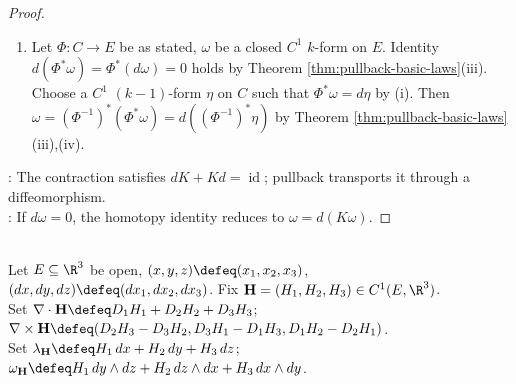 \begin{theorem}
\begin{proof}
\begin{enumerate}[label=(\roman*)]
Coefficients containing $dx_j$ with $j\notin I$ cancel against those of $K(d(b_I\,dx_I))$. Signs are opposite by Proposition \ref{prop:basic-forms-standard-presentation}(i).\\
Hence $dK\omega+Kd\omega=\omega$. If $d\omega=0$, then $K\omega\in C^1$ and $\omega=d(K\omega)$, so $\omega$ is exact.
\item Let $\Phi:C\to E$ be as stated, $\omega$ be a closed $C^1$ $k$-form on $E$. Identity $d(\Phi^\ast\omega)=\Phi^\ast(d\omega)=0$ holds by Theorem \ref{thm:pullback-basic-laws}(iii).\\
Choose a $C^1$ $(k-1)$-form $\eta$ on $C$ such that $\Phi^\ast\omega=d\eta$ by (i). Then $\omega=(\Phi^{-1})^\ast(\Phi^\ast\omega)=d((\Phi^{-1})^\ast\eta)$ by Theorem \ref{thm:pullback-basic-laws}(iii),(iv).
\end{enumerate}
: The contraction satisfies $dK+Kd=\operatorname{id}$; pullback transports it through a diffeomorphism.\\
: If $d\omega=0$, the homotopy identity reduces to $\omega=d(K\omega)$.
\end{proof}
\end{theorem}

\begin{definition} \label{def:vector-fields-as-differential-forms} \\
Let $E\subseteq\R^3$ be open, $(x,y,z)\defeq(x_1,x_2,x_3)$, $(dx,dy,dz)\defeq(dx_1,dx_2,dx_3)$. Fix $\mathbf{H}=(H_1,H_2,H_3)\in C^1(E,\R^3)$.\\
Set $\nabla\cdot\mathbf{H}\defeq D_1H_1+D_2H_2+D_3H_3$; $\nabla\times\mathbf{H}\defeq(D_2H_3-D_3H_2,D_3H_1-D_1H_3,D_1H_2-D_2H_1)$.\\
Set $\lambda_{\mathbf{H}}\defeq H_1\,dx+H_2\,dy+H_3\,dz$; $\omega_{\mathbf{H}}\defeq H_1\,dy\wedge dz+H_2\,dz\wedge dx+H_3\,dx\wedge dy$.
\end{definition}

